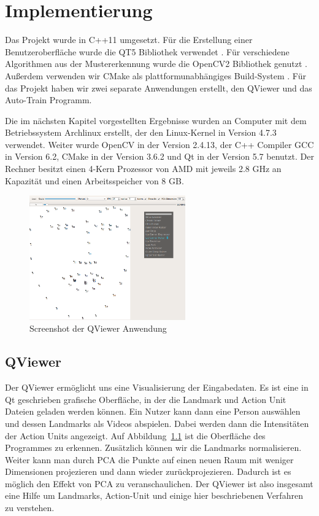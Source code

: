 \chapter{Implementierung}\label{ch:implementierung}
Das Projekt wurde in C++11 umgesetzt. Für die Erstellung einer Benutzeroberfläche wurde die QT5 Bibliothek verwendet \cite{qt5}.
Für verschiedene Algorithmen aus der Mustererkennung wurde die OpenCV2 Bibliothek genutzt \cite{opencv}. Außerdem verwenden wir CMake
als plattformunabhängiges Build-System \cite{cmake}. Für das Projekt haben wir zwei separate Anwendungen erstellt, den QViewer und das Auto-Train
Programm.

Die im nächsten Kapitel vorgestellten Ergebnisse wurden an Computer mit dem Betriebssystem Archlinux erstellt, der den Linux-Kernel in Version 4.7.3 verwendet. Weiter wurde OpenCV in der Version 2.4.13, der C++ Compiler GCC in Version 6.2, CMake in der Version 3.6.2 und Qt in der Version 5.7 benutzt. Der Rechner besitzt einen 4-Kern Prozessor von AMD mit jeweils 2.8 GHz an Kapazität und einen Arbeitsspeicher von 8 GB. 

\begin{figure}[ht]
\begin{center}
\includegraphics[width=0.6\textwidth]{qviewer.png}
\end{center}
\caption{Screenshot der QViewer Anwendung}
\label{fig:implementierung.QViewer}
\end{figure}

\section{QViewer}
Der QViewer ermöglicht uns eine Visualisierung der Eingabedaten.
Es ist eine in Qt geschrieben grafische Oberfläche, in der
die Landmark und Action Unit Dateien geladen werden können. 
Ein Nutzer kann dann eine Person auswählen und dessen Landmarks als Videos abspielen.
Dabei werden dann die Intensitäten der Action Units angezeigt. Auf Abbildung~\ref{fig:implementierung.QViewer} ist die Oberfläche des Programmes zu erkennen.
Zusätzlich können wir die Landmarks normalisieren. Weiter kann man durch PCA die Punkte auf einen neuen Raum mit weniger Dimensionen projezieren und dann wieder zurückprojezieren. Dadurch ist es möglich den Effekt von PCA zu veranschaulichen.
Der QViewer ist also insgesamt eine Hilfe um Landmarks, Action-Unit und einige hier beschriebenen Verfahren zu verstehen.



